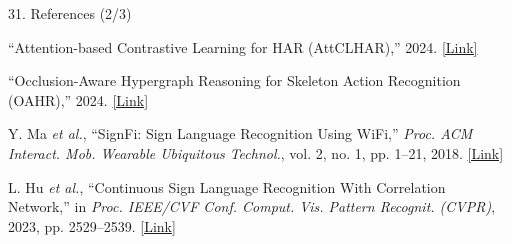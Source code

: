 \documentclass[aspectratio=169,11pt]{beamer}
\begin{document}
\begin{frame}{31. References (2/3)}

\footnotesize
\color{black}
\raggedright

\begin{list}
    {}
    {
        \setlength{\leftmargin}{0.45cm}
        \setlength{\labelwidth}{0cm}
        \setlength{\labelsep}{0.10cm}
        \setlength{\itemsep}{8pt}
        \setlength{\parsep}{0pt}
        \setlength{\topsep}{0pt}
    }

\item[\textbf{[5]}]
``Attention-based Contrastive Learning for HAR (AttCLHAR),''
2024.
\hspace{2pt}
\href{https://pmc.ncbi.nlm.nih.gov/articles/PMC10857438/}
{\textcolor{AmritaMaroon}{[Link]}}

\item[\textbf{[6]}]
``Occlusion-Aware Hypergraph Reasoning for Skeleton Action Recognition
(OAHR),'' 2024.
\hspace{2pt}
\href{https://www.researchgate.net/publication/363910427_Revisiting_Skeleton-based_Action_Recognition}
{\textcolor{AmritaMaroon}{[Link]}}

\item[\textbf{[7]}]
Y. Ma \emph{et al.}, ``SignFi: Sign Language Recognition Using WiFi,''
\emph{Proc. ACM Interact. Mob. Wearable Ubiquitous Technol.},
vol. 2, no. 1, pp. 1--21, 2018.
\hspace{2pt}
\href{https://dl.acm.org/doi/10.1145/3191755}
{\textcolor{AmritaMaroon}{[Link]}}

\item[\textbf{[8]}]
L. Hu \emph{et al.}, ``Continuous Sign Language Recognition With
Correlation Network,'' in \emph{Proc. IEEE/CVF Conf. Comput. Vis.
Pattern Recognit. (CVPR)}, 2023, pp. 2529--2539.
\hspace{2pt}
\href{https://openaccess.thecvf.com/content/CVPR2023/html/Hu_Continuous_Sign_Language_Recognition_With_Correlation_Network_CVPR_2023_paper.html}
{\textcolor{AmritaMaroon}{[Link]}}

\end{list}

\end{frame}


\end{document}
